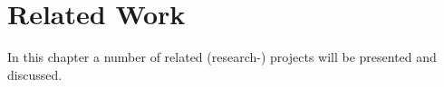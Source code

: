 
\chapter{Related Work}

In this chapter a number of related (research-) projects will be presented and discussed. 



